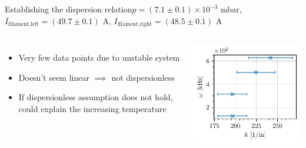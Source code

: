 \documentclass[10pt]{beamer}
\begin{document}
\begin{frame}{Establishing the dispersion relation}{$p = (7.1 \pm 0.1) \times 10^{-3}$ mbar, $I_\text{filament,left} = (49.7 \pm 0.1)$ A, $I_\text{filament,right} = (48.5 \pm 0.1)$ A}
    \begin{columns}
        \centering
        \vspace{-1cm}
        \begin{itemize}
            \item Very few data points due to unstable system
            \item Doesn't seem linear $\implies$ not dispersionless
            \item If dispersionless assumption does not hold, could explain the increasing temperature
        \end{itemize}
        
        \centering
        \includegraphics[scale=1]{../figures/dispersion_relation.pdf}
    \end{columns}
\end{frame}
\end{document}
